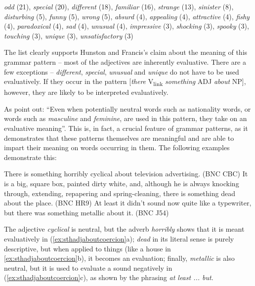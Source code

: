 \begin{exe}
\ex \textit{odd} (21), \textit{special} (20), \textit{different} (18), \textit{familiar} (16), \textit{strange} (13), \textit{sinister} (8), \textit{disturbing} (5), \textit{funny} (5), \textit{wrong} (5), \textit{absurd} (4), \textit{appealing} (4), \textit{attractive} (4), \textit{fishy} (4), \textit{paradoxical} (4), \textit{sad} (4), \textit{unusual} (4), \textit{impressive} (3), \textit{shocking} (3), \textit{spooky} (3), \textit{touching} (3), \textit{unique} (3), \textit{unsatisfactory} (3)
\label{ex:sthadjaboutgrampat}
\end{exe}

The list clearly supports Hunston and Francis's claim about the meaning  of this grammar  pattern  -- most of the adjectives  are inherently evaluative. There are a few exceptions -- \textit{different}, \textit{special}, \textit{unusual} and \textit{unique} do not have to be used evaluatively. If they occur in the pattern [\textit{there} V\textsubscript{link} \textit{something} ADJ \textit{about} NP], however, they are likely to be interpreted evaluatively.

As \citet[105]{hunston_pattern_2000} point out: ``Even when potentially neutral words such as nationality words, or words such as \textit{masculine} and \textit{feminine}, are used in this pattern, they take on an evaluative meaning''.  This is, in fact, a crucial feature of grammar  patterns,  as it demonstrates that these patterns themselves are meaningful and are able to impart their meaning on words occurring in them. The following examples demonstrate this:

\begin{exe}
\ex
\begin{xlist}
\label{ex:sthadjaboutcoercion}
\ex There is something horribly cyclical about television advertising. (BNC CBC)
\ex It is a big, square box, painted dirty white, and, although he is always knocking through, extending, repapering and spring\hyp{}cleaning, there is something dead about the place. (BNC HR9)
\ex At least it didn't sound now quite like a typewriter, but there was something metallic about it. (BNC J54)
\end{xlist}
\end{exe}

The adjective  \textit{cyclical} is neutral, but the adverb  \textit{horribly} shows that it is meant evaluatively in (\ref{ex:sthadjaboutcoercion}a); \textit{dead} in its literal  sense is purely descriptive,  but when applied to things (like a house in \ref{ex:sthadjaboutcoercion}b), it becomes an evaluation; finally, \textit{metallic} is also neutral, but it is used to evaluate a sound negatively in (\ref{ex:sthadjaboutcoercion}c), as shown by the phrasing \textit{at least ... but}.

